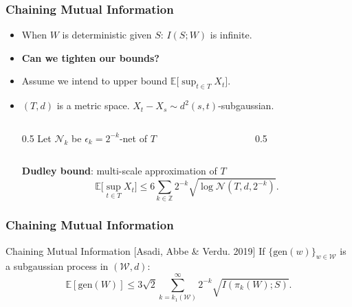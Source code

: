 \documentclass[usenames,dvipsnames, 10pt]{beamer}
\newcommand{\E}{\mathbb{E}}
\begin{document}
\begin{frame}
	\frametitle{Chaining Mutual Information}
	\begin{itemize}
		\item When $W$ is deterministic given $S$: $I(S; W)$ is infinite.
		\pause
		\item \textbf{Can we tighten our bounds?}
		\pause
		
		\item Assume we intend to upper bound $\E\Big[\sup_{t \in T} X_t\Big]$.
		
		\item $(T, d)$ is a metric space. $X_t - X_s \sim d^2(s, t)$-subgaussian.
		\pause
		\begin{columns}
			\begin{column}{0.5\textwidth} 
				\hspace{1cm} Let $\mathcal{N}_k$ be $\epsilon_k = 2^{-k}$-net of $T$ 
				
			\end{column}
			\begin{column}{0.5\textwidth} 
			\end{column}
		\end{columns}
		
		
		\pause
		\textbf{Dudley bound}: multi-scale approximation of $T$
		\begin{equation*}
		\E\Big[\sup_{t \in T} X_t\Big] \leq 6 \sum_{k \in \mathbb{Z}} 2^{-k} 	\sqrt{\log \mathcal{N}(T, d, 2^{-k})}.
		\end{equation*}
		
	\end{itemize}	
\end{frame}


\begin{frame}
	\frametitle{Chaining Mutual Information}
			\begin{exampleblock}{Chaining Mutual Information {\scriptsize[Asadi, Abbe \& Verdu. 2019]}}
			 If $\{\mathrm{gen}(w)\}_{w\in\mathcal{W}}$ is a subgaussian process in $(\mathcal{W}, d)$:
			\begin{equation*}
			\E[\mathrm{gen}(W)] \leq 3\sqrt{2} \sum_{k = k_1(\mathcal{W})}^{\infty} 2^{-k} \sqrt{I(\pi_k(W); S)}.
			\end{equation*}		
			\vspace{-0.4cm}	 
		\end{exampleblock}
\end{frame}
\end{document}

